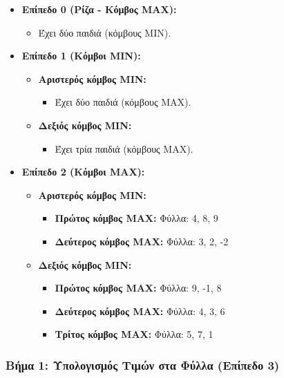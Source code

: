 \documentclass{article}
\begin{document}
\begin{itemize}
    \item \textbf{Επίπεδο 0 (Ρίζα - Κόμβος MAX):}
    \begin{itemize}
        \item Έχει δύο παιδιά (κόμβους MIN).
    \end{itemize}
    \item \textbf{Επίπεδο 1 (Κόμβοι MIN):}
    \begin{itemize}
        \item \textbf{Αριστερός κόμβος MIN:}
        \begin{itemize}
            \item Έχει δύο παιδιά (κόμβους MAX).
        \end{itemize}
        \item \textbf{Δεξιός κόμβος MIN:}
        \begin{itemize}
            \item Έχει τρία παιδιά (κόμβους MAX).
        \end{itemize}
    \end{itemize}
    \item \textbf{Επίπεδο 2 (Κόμβοι MAX):}
    \begin{itemize}
        \item \textbf{Αριστερός κόμβος MIN:}
        \begin{itemize}
            \item \textbf{Πρώτος κόμβος MAX:} Φύλλα: 4, 8, 9
            \item \textbf{Δεύτερος κόμβος MAX:} Φύλλα: 3, 2, -2
        \end{itemize}
        \item \textbf{Δεξιός κόμβος MIN:}
        \begin{itemize}
            \item \textbf{Πρώτος κόμβος MAX:} Φύλλα: 9, -1, 8
            \item \textbf{Δεύτερος κόμβος MAX:} Φύλλα: 4, 3, 6
            \item \textbf{Τρίτος κόμβος MAX:} Φύλλα: 5, 7, 1
        \end{itemize}
    \end{itemize}
\end{itemize}

\subsubsection*{Βήμα 1: Υπολογισμός Τιμών στα Φύλλα (Επίπεδο 3)}
\end{document}
